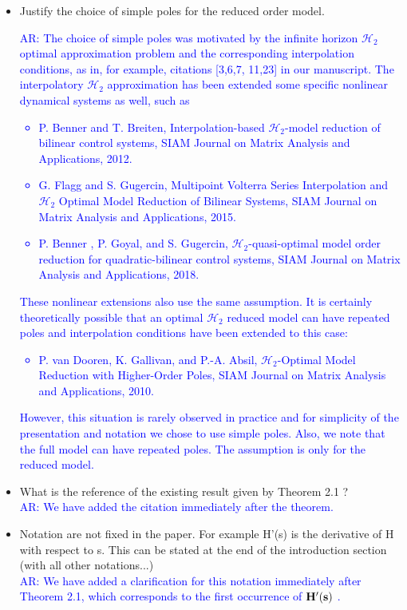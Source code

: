 \documentclass[11pt]{article}
\def\serkan#1{\textcolor{blue}{{#1}}}
\begin{document}
\begin{itemize}
\item Justify the choice of simple poles for the reduced order model. \\ [1ex]
\serkan{\textsf{AR}:  The choice of simple poles was motivated by the infinite horizon $\mathcal{H}_2$ optimal approximation problem and the corresponding interpolation conditions, as in, for example, citations [3,6,7, 11,23] in our manuscript. The interpolatory $\mathcal{H}_2$  approximation has been extended some specific nonlinear dynamical systems as well, such as 
\begin{itemize}
\item   P. Benner and T. Breiten, Interpolation-based $\mathcal{H}_2$-model reduction of
                  bilinear control systems, SIAM Journal on Matrix Analysis and Applications, 2012.
\item  G. Flagg and S. Gugercin,  Multipoint Volterra Series Interpolation and $\mathcal{H}_2$ Optimal Model Reduction of Bilinear Systems, SIAM Journal on Matrix Analysis and Applications, 2015.
\item P. Benner , P. Goyal, and S. Gugercin, $\mathcal{H}_2$-quasi-optimal model order reduction for quadratic-bilinear control systems, SIAM Journal on Matrix Analysis and Applications, 2018.
\end{itemize}
These nonlinear extensions also use the same assumption. It is certainly theoretically possible that an optimal $\mathcal{H}_2$ reduced model can have repeated poles and interpolation conditions have been extended to this case: 
\begin{itemize}
\item P. van Dooren, K. Gallivan, and  P.-A. Absil, 
$\mathcal{H}_2$-Optimal Model Reduction with Higher-Order Poles,
	SIAM Journal on Matrix Analysis and Applications, 2010.
\end{itemize}
However, this situation is rarely observed in practice and for simplicity of the presentation and notation we chose to use simple poles. Also, we note that the full model can have repeated poles. The assumption is only for the reduced model.
}  

\item What is the reference of the existing result given by Theorem 2.1 ? \\ [1ex]
\serkan{\textsf{AR}:  We have added the citation immediately after the theorem.}  

\item Notation are not fixed in the paper. For example H'(s) is the
derivative of H with respect to s. This can be stated at the end of the
introduction section (with all other notations...)\\ [1ex]
\serkan{\textsf{AR}:  We have added a clarification for this notation immediately after Theorem 2.1, which corresponds to the first occurrence of $\bf{H}'(s)$ .} 


\end{itemize}
\end{document}
